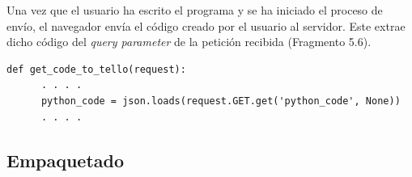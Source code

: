 \documentclass{report}
\begin{document}
Una vez que el usuario ha escrito el programa y se ha iniciado el proceso de envío, el navegador envía el código creado por el usuario al servidor. Este extrae dicho código del \textit{query parameter} de la petición recibida (Fragmento 5.6). 
\\
\begin{lstlisting}[frame=single,breaklines=true, label=Extracción del programa fuente en el servidor, caption=Extracción del programa fuente en el servidor, captionpos=b]
   def get_code_to_tello(request):
      . . . .
      python_code = json.loads(request.GET.get('python_code', None))
      . . . .

\end{lstlisting}


\subsection{Empaquetado}
\end{document}
